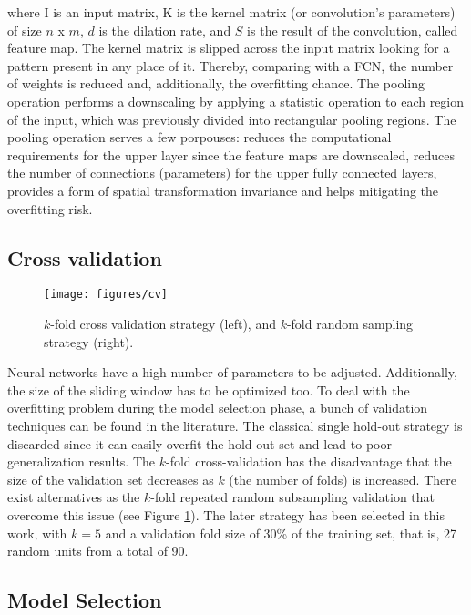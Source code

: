 \documentclass[PHM, 2021]{PHMSociety}
\begin{document}
where I is an input matrix, K is the kernel matrix (or convolution's parameters) of size $n$ x $m$, $d$ is the dilation rate, and $S$ is the result of the convolution, called feature map. The kernel matrix is slipped across the input matrix looking for a pattern present in any place of it. Thereby, comparing with a FCN, the number of weights is reduced and, additionally, the overfitting chance. The pooling operation performs a downscaling by applying a statistic operation to each region of the input, which was previously divided into rectangular pooling regions. The pooling operation serves a few porpouses: reduces the computational requirements for the upper layer since the feature maps are downscaled, reduces the number of connections (parameters) for the upper fully connected layers, provides a form of spatial transformation invariance and helps mitigating the overfitting risk.

\subsection{Cross validation}

\begin{figure}[t]
\centering
\texttt{[image: figures/cv]}
\caption{$k$-fold cross validation strategy (left), and $k$-fold random sampling strategy (right).}
\label{fig:cv}
\end{figure}

Neural networks have a high number of parameters to be adjusted. Additionally, the size of the sliding window has to be optimized too. To deal with the overfitting problem during the model selection phase, a bunch of validation techniques can be found in the literature. The classical single hold-out strategy is discarded since it can easily overfit the hold-out set and lead to poor generalization results. The $k$-fold cross-validation has the disadvantage that the size of the validation set decreases as $k$ (the number of folds) is increased. There exist alternatives as the $k$-fold repeated random subsampling validation that overcome this issue (see Figure \ref{fig:cv}). The later strategy has been selected in this work, with $k=5$ and a validation fold size of 30\% of the training set, that is, 27 random units from a total of 90.

\subsection{Model Selection}
\end{document}
